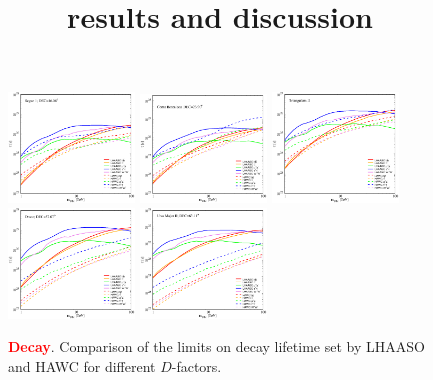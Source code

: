 \documentclass[aps,prd,amsmath,amssymb,showpacs,floats,floatfix,nofootinbib,reprint]{revtex4-1}
\def\red#1{{\textcolor{red}{#1}}} %
\begin{document}

\title{results and discussion} 



\begin{figure}%
\caption{\textbf{\red{Decay}}. Comparison of the limits on decay lifetime set by LHAASO and HAWC for different $D$-factors.}
{\includegraphics[width=0.3\textwidth]{comparison_segue1.eps}}
{\includegraphics[width=0.3\textwidth]{comparison_comab.eps}}
{\includegraphics[width=0.3\textwidth]{comparison_trian2.eps}}
{\includegraphics[width=0.3\textwidth]{comparison_draco.eps}}
{\includegraphics[width=0.3\textwidth]{comparison_urmajor2.eps}}

\end{figure}
\end{document}

